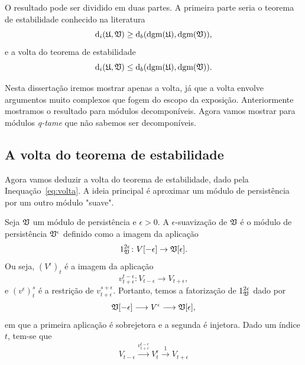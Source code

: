 O resultado pode ser dividido em duas partes. A primeira parte seria o 
teorema de estabilidade conhecido na literatura \cite{CohenSteiner2006, 
ChazalProx2009}
\begin{equation}\label{eq:ida}
    \text{d}_i(\mathfrak{U}, \mathfrak{V}) \geq \text{d}_b(\text{dgm}(\mathfrak{U}), \text{dgm}(\mathfrak{V})),
\end{equation}
e a volta do teorema de estabilidade
\begin{equation}\label{eq:volta}
    \text{d}_i(\mathfrak{U}, \mathfrak{V}) \leq \text{d}_b(\text{dgm}(\mathfrak{U}), \text{dgm}(\mathfrak{V})).
\end{equation}

Nesta dissertação iremos mostrar apenas a volta, já que a volta envolve argumentos
muito complexos que fogem do escopo da exposição. 
Anteriormente mostramos o resultado para módulos decomponíveis. Agora vamos mostrar
para módulos \textit{q-tame} que não sabemos ser decomponíveis.  
 
\subsection{A volta do teorema de estabilidade}

Agora vamos deduzir a volta do teorema de estabilidade, dado pela Inequação~\ref{eq:volta}. 
A ideia principal é aproximar um módulo de persistência por um outro módulo "suave".

\begin{defi}
    Seja $\mathfrak{V}$ um módulo de persistência e $\epsilon > 0$. A $\epsilon$-suavização 
    de $\mathfrak{V}$ é o módulo de persistência $\mathfrak{V}^\epsilon$ definido como a imagem
    da aplicação 
    \begin{equation*}
        1^{2\epsilon}_{\mathfrak{V}} \colon V[-\epsilon] \to \mathfrak{V}[\epsilon].
    \end{equation*}
    Ou seja, $(V^\epsilon)_t$ é a imagem da aplicação
    \begin{equation*}
        v_{t+\epsilon}^{t-\epsilon} \colon V_{t-\epsilon} \to V_{t+\epsilon},
    \end{equation*}
    e $(v^\epsilon)^s_t$ é a restrição de $v^{s+\epsilon}_{t+\epsilon}$. 
    Portanto, temos a fatorização de $1^{2\epsilon}_{\mathfrak{V}}$ dado por
    \begin{equation} \label{eq:fatorizacao}
        \mathfrak{V}[-\epsilon] \longrightarrow V^\epsilon \longrightarrow \mathfrak{V}[\epsilon],
    \end{equation}
    em que a primeira aplicação é sobrejetora e a segunda é injetora. Dado um índice $t$,
    tem-se que 
    \begin{equation*}
        V_{t-\epsilon} \xrightarrow{v^{t-\epsilon}_{t+\epsilon}} V^\epsilon_t 
        \xrightarrow{1} V_{t+\epsilon}
    \end{equation*}
\end{defi}

